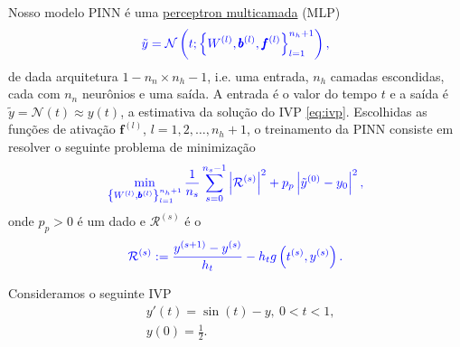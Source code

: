 Nosso modelo PINN é uma \href{https://notaspedrok.com.br/notas/RedesNeuraisArtificiais/cap_mlp_sec_modelo.html}{perceptron multicamada} (MLP)
\begin{equation}\color{blue}\tilde{y} = \mathcal{N}\left(t; \left\{W^{(l)}, \pmb{b}^{(l)}, \pmb{f}^{(l)}\right\}_{l=1}^{n_h+1}\right),
\end{equation}
de dada arquitetura $1 - n_n\times n_h - 1$, i.e. uma entrada, $n_h$ camadas escondidas, cada com $n_n$ neurônios e uma saída. A entrada é o valor do tempo $t$ e a saída é $\tilde{y} = \mathcal{N}(t) \approx y(t)$, a estimativa da solução do IVP \eqref{eq:ivp}. Escolhidas as funções de ativação $\pmb{f}^{(l)}$, $l = 1, 2, \dotsc, n_h+1$, o treinamento da PINN consiste em resolver o seguinte problema de minimização
\begin{equation}\color{blue}\min_{\left\{W^{(l)}, \pmb{b}^{(l)}\right\}_{l=1}^{n_h+1}} \frac{1}{n_s}\sum_{s=0}^{n_s-1}\left|\mathcal{R}^{(s)}\right|^2 + p_p\left|\tilde{y}^{(0)} - y_0\right|^2,
\end{equation}
onde $p_p>0$ é um dado  e $\mathcal{R}^{(s)}$ é o 
\begin{equation}\color{blue}\mathcal{R}^{(s)} := \frac{y^{(s+1)} - y^{(s)}}{h_t} - h_tg\left(t^{(s)}, y^{(s)}\right).
\end{equation}

\begin{ex}
  Consideramos o seguinte IVP
  \begin{subequations}
    \begin{align}
      &y'(t) = \sin(t) - y, ~0 < t < 1,\\
      &y(0) = \frac{1}{2}.
    \end{align}
  \end{subequations}
\end{ex}

